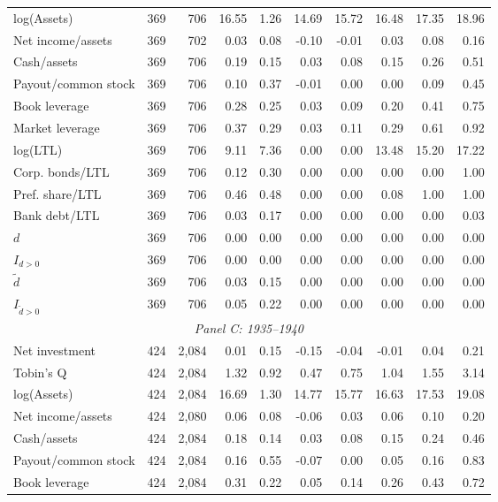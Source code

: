 \begin{threeparttable}
\begin{tabular}{lrrrrrrrrr}
log(Assets) & 369 & 706 & 16.55 & 1.26 & 14.69 & 15.72 & 16.48 & 17.35 & 18.96 \\
Net income/assets & 369 & 702 & 0.03 & 0.08 & -0.10 & -0.01 & 0.03 & 0.08 & 0.16 \\
Cash/assets & 369 & 706 & 0.19 & 0.15 & 0.03 & 0.08 & 0.15 & 0.26 & 0.51 \\
Payout/common stock & 369 & 706 & 0.10 & 0.37 & -0.01 & 0.00 & 0.00 & 0.09 & 0.45 \\
Book leverage & 369 & 706 & 0.28 & 0.25 & 0.03 & 0.09 & 0.20 & 0.41 & 0.75 \\
Market leverage & 369 & 706 & 0.37 & 0.29 & 0.03 & 0.11 & 0.29 & 0.61 & 0.92 \\
log(LTL) & 369 & 706 & 9.11 & 7.36 & 0.00 & 0.00 & 13.48 & 15.20 & 17.22 \\
Corp. bonds/LTL & 369 & 706 & 0.12 & 0.30 & 0.00 & 0.00 & 0.00 & 0.00 & 1.00 \\
Pref. share/LTL & 369 & 706 & 0.46 & 0.48 & 0.00 & 0.00 & 0.08 & 1.00 & 1.00 \\
Bank debt/LTL & 369 & 706 & 0.03 & 0.17 & 0.00 & 0.00 & 0.00 & 0.00 & 0.03 \\
\ensuremath{d} & 369 & 706 & 0.00 & 0.00 & 0.00 & 0.00 & 0.00 & 0.00 & 0.00 \\
\ensuremath{I_{d>0}} & 369 & 706 & 0.00 & 0.00 & 0.00 & 0.00 & 0.00 & 0.00 & 0.00 \\
\ensuremath{\tilde{d}} & 369 & 706 & 0.03 & 0.15 & 0.00 & 0.00 & 0.00 & 0.00 & 0.00 \\
\ensuremath{I_{\tilde{d}>0}} & 369 & 706 & 0.05 & 0.22 & 0.00 & 0.00 & 0.00 & 0.00 & 0.00 \\
\midrule
\multicolumn{10}{c}{\textit{Panel C: 1935--1940}} \\
\midrule
Net investment & 424 & 2,084 & 0.01 & 0.15 & -0.15 & -0.04 & -0.01 & 0.04 & 0.21 \\
Tobin's Q & 424 & 2,084 & 1.32 & 0.92 & 0.47 & 0.75 & 1.04 & 1.55 & 3.14 \\
log(Assets) & 424 & 2,084 & 16.69 & 1.30 & 14.77 & 15.77 & 16.63 & 17.53 & 19.08 \\
Net income/assets & 424 & 2,080 & 0.06 & 0.08 & -0.06 & 0.03 & 0.06 & 0.10 & 0.20 \\
Cash/assets & 424 & 2,084 & 0.18 & 0.14 & 0.03 & 0.08 & 0.15 & 0.24 & 0.46 \\
Payout/common stock & 424 & 2,084 & 0.16 & 0.55 & -0.07 & 0.00 & 0.05 & 0.16 & 0.83 \\
Book leverage & 424 & 2,084 & 0.31 & 0.22 & 0.05 & 0.14 & 0.26 & 0.43 & 0.72 \\

\end{tabular}
\end{threeparttable}
